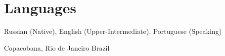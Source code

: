 \documentclass[11pt,a4paper,sans]{moderncv}        %
\begin{document}
		
		
		
		
		\section{Languages}
		Russian (Native), English (Upper-Intermediate), Portuguese (Speaking)
		
		\vspace*{\fill}
		\name{}{}
		\title{}
		\address{Rua Barata Ribeiro, 194}{Copacobana, Rio de Janeiro}{ Brazil }
		\makecvtitle
	
\end{document}
